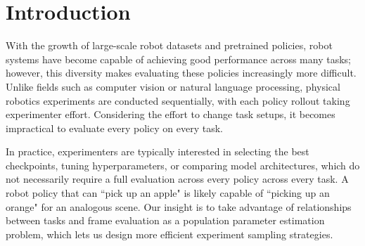 \section{Introduction}

With the growth of large-scale robot datasets and pretrained policies, robot systems have become capable of achieving good performance across many tasks; however, this diversity makes evaluating these policies increasingly more difficult.
Unlike fields such as computer vision or natural language processing, physical robotics experiments are conducted sequentially, with each policy rollout taking experimenter effort.
Considering the effort to change task setups, it becomes impractical to evaluate every policy on every task.

In practice, experimenters are typically interested in selecting the best checkpoints, tuning hyperparameters, or comparing model architectures, which do not necessarily require a full evaluation across every policy across every task.
A robot policy that can ``pick up an apple" is likely capable of ``picking up an orange" for an analogous scene.
Our insight is to take advantage of relationships between tasks and frame evaluation as a population parameter estimation problem, which lets us design more efficient experiment sampling strategies.

